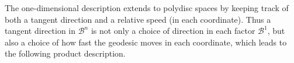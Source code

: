 \documentclass[10pt]{article}
\theoremstyle{definition}
\begin{document}


The one-dimensional description extends to polydisc spaces by keeping track of both a tangent direction and a relative speed (in each coordinate). Thus a tangent direction in $\mathcal B^n$ is not only a choice of direction in each factor $\mathcal B^1$, but also a choice of how fast the geodesic moves in each coordinate, which leads to the following product description.
\end{document}
